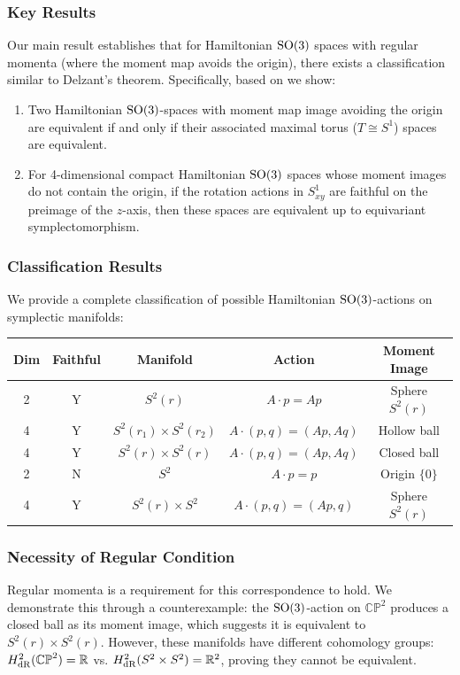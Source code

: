 \subsubsection*{Key Results}
Our main result establishes that for Hamiltonian $\rm{SO}(3)$ spaces with regular momenta (where the moment map avoids the origin), there exists a classification similar to Delzant's theorem. Specifically, based on \textcite{Blaom1996} we show:
\begin{enumerate}
\item Two Hamiltonian $\rm{SO}(3)$-spaces with moment map image avoiding the origin are equivalent if and only if their associated maximal torus ($T \cong S^1$) spaces are equivalent.
\item For 4-dimensional compact Hamiltonian $\rm{SO}(3)$ spaces whose moment images do not contain the origin, if the rotation actions in $S^1_{xy}$ are faithful on the preimage of the $z$-axis, then these spaces are equivalent up to equivariant symplectomorphism.
\end{enumerate}
\subsubsection*{Classification Results}
We provide a complete classification of possible Hamiltonian $\rm{SO}(3)$-actions on symplectic manifolds:

\begin{center}
\begin{tabular}{|c|c|c|c|c|}
    \hline
    \textbf{Dim} & \textbf{Faithful} & \textbf{Manifold} & \textbf{Action} & \textbf{Moment Image} \\
    \hline
    2 & Y & $S^2(r)$ & $A \cdot p = Ap$ & Sphere $S^2(r)$ \\
    \hline
    4 & Y & $S^2(r_1) \times S^2(r_2)$ & $A \cdot (p,q) = (Ap,Aq)$ & Hollow ball \\
    \hline
    4 & Y & $S^2(r) \times S^2(r)$ & $A \cdot (p,q) = (Ap,Aq)$ & Closed ball \\
    \hline
    2 & N & $S^2$ & $A \cdot p = p$ & Origin $\{0\}$ \\
    \hline
    4 & Y & $S^2(r) \times S^2$ & $A \cdot (p,q) = (Ap,q)$ & Sphere $S^2(r)$ \\
    \hline
\end{tabular}
\end{center}

\subsubsection*{Necessity of Regular Condition}
Regular momenta is a requirement for this correspondence to hold. We demonstrate this through a counterexample: the $\rm{SO}(3)$-action on $\mathbb{CP}^2$ produces a closed ball as its moment image, which suggests it is equivalent to $S^2(r) \times S^2(r)$. However, these manifolds have different cohomology groups: $H^2_{\rm{dR}}(\mathbb{CP}^2) = \mathbb{R}$ vs. $H^2_{\rm{dR}}(S^2 \times S^2) = \mathbb{R}^2$, proving they cannot be equivalent.
